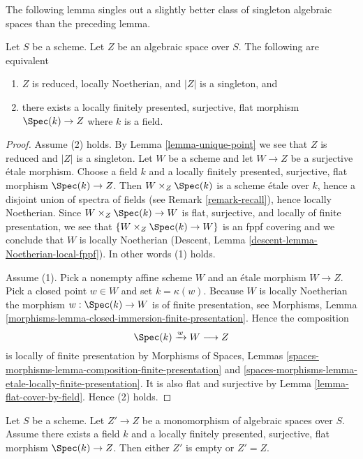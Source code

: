 \noindent
The following lemma singles out a slightly better class of singleton
algebraic spaces than the preceding lemma.

\begin{lemma}
\label{lemma-unique-point-better}
Let $S$ be a scheme. Let $Z$ be an algebraic space over $S$.
The following are equivalent
\begin{enumerate}
\item $Z$ is reduced, locally Noetherian, and $|Z|$
is a singleton, and
\item there exists a locally finitely presented, surjective, flat morphism
$\Spec(k) \to Z$ where $k$ is a field.
\end{enumerate}
\end{lemma}

\begin{proof}
Assume (2) holds. By
Lemma \ref{lemma-unique-point}
we see that $Z$ is reduced and $|Z|$ is a singleton.
Let $W$ be a scheme and let $W \to Z$ be a surjective \'etale
morphism. Choose a field $k$ and a locally finitely presented, surjective,
flat morphism $\Spec(k) \to Z$.
Then $W \times_Z \Spec(k)$ is a scheme
\'etale over $k$, hence a disjoint union of spectra of fields
(see Remark \ref{remark-recall}),
hence locally Noetherian. Since $W \times_Z \Spec(k) \to W$
is flat, surjective, and locally of finite presentation, we see
that $\{W \times_Z \Spec(k) \to W\}$ is an fppf covering
and we conclude that $W$ is locally Noetherian
(Descent, Lemma
\ref{descent-lemma-Noetherian-local-fppf}).
In other words (1) holds.

\medskip\noindent
Assume (1). Pick a nonempty affine scheme $W$ and an \'etale morphism
$W \to Z$. Pick a closed point $w \in W$ and set
$k = \kappa(w)$. Because $W$ is locally Noetherian the morphism
$w : \Spec(k) \to W$ is of finite presentation, see
Morphisms, Lemma \ref{morphisms-lemma-closed-immersion-finite-presentation}.
Hence the composition
$$
\Spec(k) \xrightarrow{w} W \longrightarrow Z
$$
is locally of finite presentation by
Morphisms of Spaces, Lemmas
\ref{spaces-morphisms-lemma-composition-finite-presentation} and
\ref{spaces-morphisms-lemma-etale-locally-finite-presentation}.
It is also flat and surjective by
Lemma \ref{lemma-flat-cover-by-field}.
Hence (2) holds.
\end{proof}

\begin{lemma}
\label{lemma-monomorphism-into-point}
Let $S$ be a scheme.
Let $Z' \to Z$ be a monomorphism of algebraic spaces over $S$.
Assume there exists a field $k$ and a locally finitely presented, surjective,
flat morphism $\Spec(k) \to Z$. Then either $Z'$
is empty or $Z' = Z$.
\end{lemma}

